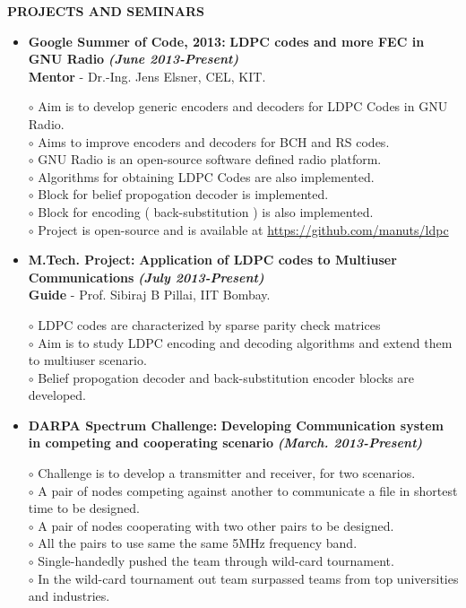 \documentclass[a4paper,10pt]{article}
\begin{document}
 \colorbox{titleColor}{\parbox{6.5in}{\textbf{PROJECTS AND SEMINARS}}}

 \begin{itemize}
 \setlength{\itemsep}{1pt}
 
 \item \textbf{Google Summer of Code, 2013:} \textbf{LDPC codes and more FEC in GNU Radio}  \textbf \emph{(June 2013-Present)}\\
        {\textbf{Mentor} - Dr.-Ing. Jens Elsner, CEL, KIT.   }          %

        $\circ$ Aim is to develop generic encoders and decoders for LDPC Codes in GNU Radio. \\
        $\circ$ Aims to improve encoders and decoders for BCH and RS codes. \\
        $\circ$ GNU Radio is an open-source software defined radio platform. \\
        $\circ$ Algorithms for obtaining LDPC Codes are also implemented. \\
        $\circ$ Block for belief propogation decoder is implemented. \\
        $\circ$ Block for encoding ( back-substitution ) is also implemented. \\
        $\circ$ Project is open-source and is available at \url{https://github.com/manuts/ldpc}

        \item \textbf{M.Tech. Project:} \textbf{Application of LDPC codes to Multiuser Communications} \textbf \emph{(July 2013-Present)} \\
        {\textbf{Guide} - Prof. Sibiraj B Pillai, IIT Bombay.}            %
        
$\circ$ LDPC codes are characterized by sparse parity check matrices \\ 
$\circ$ Aim is to study LDPC encoding and decoding algorithms and extend them to multiuser scenario. \\
$\circ$ Belief propogation decoder and back-substitution encoder blocks are developed.

        
\item \textbf{DARPA Spectrum Challenge:} \textbf{Developing Communication system in competing and cooperating scenario}
\textbf \emph{(March. 2013-Present)}

$\circ$ Challenge is to develop a transmitter and receiver, for two scenarios. \\
$\circ$ A pair of nodes competing against another to communicate a file in shortest time to be designed. \\
$\circ$ A pair of nodes cooperating with two other pairs to be designed. \\
$\circ$ All the pairs to use same the same 5MHz frequency band. \\
$\circ$ Single-handedly pushed the team through wild-card tournament. \\
$\circ$ In the wild-card tournament out team surpassed teams from top universities and industries.


\end{itemize}
\end{document}
